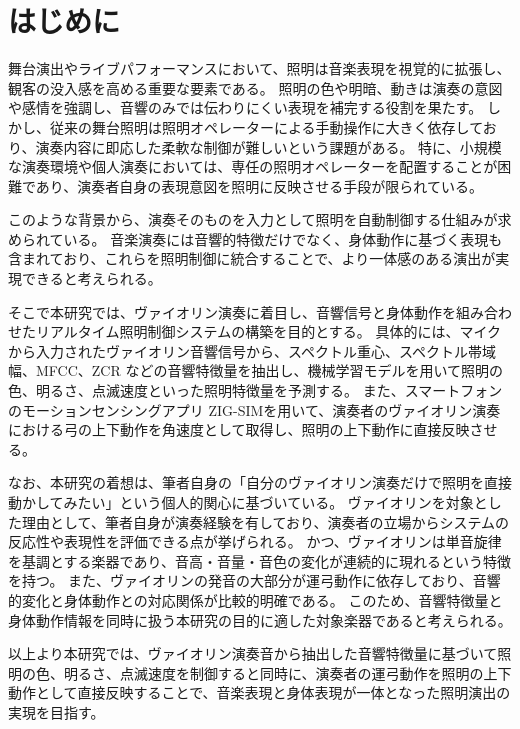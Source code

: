
\section{はじめに}

舞台演出やライブパフォーマンスにおいて、照明は音楽表現を視覚的に拡張し、観客の没入感を高める重要な要素である。
照明の色や明暗、動きは演奏の意図や感情を強調し、音響のみでは伝わりにくい表現を補完する役割を果たす。
しかし、従来の舞台照明は照明オペレーターによる手動操作に大きく依存しており、演奏内容に即応した柔軟な制御が難しいという課題がある。
特に、小規模な演奏環境や個人演奏においては、専任の照明オペレーターを配置することが困難であり、演奏者自身の表現意図を照明に反映させる手段が限られている。

このような背景から、演奏そのものを入力として照明を自動制御する仕組みが求められている。
音楽演奏には音響的特徴だけでなく、身体動作に基づく表現も含まれており、これらを照明制御に統合することで、より一体感のある演出が実現できると考えられる。

そこで本研究では、ヴァイオリン演奏に着目し、音響信号と身体動作を組み合わせたリアルタイム照明制御システムの構築を目的とする。
具体的には、マイクから入力されたヴァイオリン音響信号から、スペクトル重心、スペクトル帯域幅、MFCC、ZCR などの音響特徴量を抽出し、機械学習モデルを用いて照明の色、明るさ、点滅速度といった照明特徴量を予測する。
また、スマートフォンのモーションセンシングアプリ ZIG-SIMを用いて、演奏者のヴァイオリン演奏における弓の上下動作を角速度として取得し、照明の上下動作に直接反映させる。

なお、本研究の着想は、筆者自身の「自分のヴァイオリン演奏だけで照明を直接動かしてみたい」という個人的関心に基づいている。
ヴァイオリンを対象とした理由として、筆者自身が演奏経験を有しており、演奏者の立場からシステムの反応性や表現性を評価できる点が挙げられる。
かつ、ヴァイオリンは単音旋律を基調とする楽器であり、音高・音量・音色の変化が連続的に現れるという特徴を持つ。
また、ヴァイオリンの発音の大部分が運弓動作に依存しており、音響的変化と身体動作との対応関係が比較的明確である。
このため、音響特徴量と身体動作情報を同時に扱う本研究の目的に適した対象楽器であると考えられる。

以上より本研究では、ヴァイオリン演奏音から抽出した音響特徴量に基づいて照明の色、明るさ、点滅速度を制御すると同時に、演奏者の運弓動作を照明の上下動作として直接反映することで、音楽表現と身体表現が一体となった照明演出の実現を目指す。


